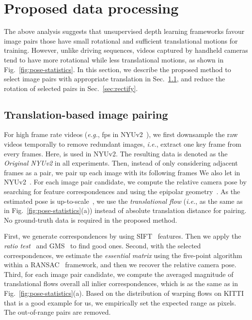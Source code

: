 \documentclass{article}
\newcommand{\figref}[1]{Fig.~\ref{#1}}
\newcommand{\secref}[1]{Sec.~\ref{#1}}
\def\eg{\emph{e.g.}}
\def\ie{\emph{i.e.}}
\begin{document}
\section{Proposed data processing}\label{sec:method}


The above analysis suggests that unsupervised depth learning frameworks favour image pairs those have small rotational and sufficient translational motions for training.
However, unlike driving sequences, videos captured by handheld cameras tend to have more rotational while less translational motions, as shown in \figref{fig:pose-statistics}.
In this section, we describe the proposed method to select image pairs with appropriate translation in \secref{sec:select},
and reduce the rotation of selected pairs in \secref{sec:rectify}.














\subsection{Translation-based image pairing}\label{sec:select}

For high frame rate videos (\eg, fps in NYUv2~\cite{silberman2012indoor}),
we first downsample the raw videos temporally to remove redundant images, \ie, extract one key frame from every  frames.
Here,  is used in NYUv2.
The resulting data is denoted as the \emph{Original NYUv2} in all experiments.
Then, instead of only considering adjacent frames as a pair, 
we pair up each image with its following  frames
We also let  in NYUv2~\cite{silberman2012indoor}.
For each image pair candidate, we compute the relative camera pose by searching for feature correspondences and using the epipolar geometry~\cite{hartley2003multiple,bian2019bench}.
As the estimated pose is up-to-scale~\cite{hartley2003multiple},
we use the \emph{translational flow} (\ie, as the same as in \figref{fig:pose-statistics}(a)) instead of absolute translation distance for pairing.
No ground-truth data is required in the proposed method.

First, we generate correspondences by using SIFT~\cite{lowe2004distinctive} features.
Then we apply the \emph{ratio test}~\cite{lowe2004distinctive} and GMS~\cite{bian2019depth} to find good ones.
Second, with the selected correspondences, we estimate the \emph{essential matrix} using the five-point algorithm~\cite{nister2004efficient} within a RANSAC~\cite{fischler1981random} framework,
and then we recover the relative camera pose.
Third, for each image pair candidate, we compute the averaged magnitude of translational flows overall all inlier correspondences, 
which is as the same as in \figref{fig:pose-statistics}(a).
Based on the distribution of warping flows on KITTI that is a good example for us,
we empirically set the expected range as  pixels.
The out-of-range pairs are removed.
\end{document}
